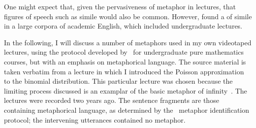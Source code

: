 One might expect that, given the pervasiveness of metaphor in
lectures, that figures of speech such as simile would also be common.
However,  found a 
of simile in a large corpora of academic English, which included
undergraduate lectures.

In the following, I will discuss a number of metaphors used in my own
videotaped lectures, using the protocol developed
by~ for undergraduate pure mathematics courses,
but with an emphasis on metaphorical language.  The source material is
taken verbatim from a lecture in which I introduced the Poisson
approximation to the binomial distribution.  This particular lecture
was chosen because the limiting process discussed is an examplar of
the basic metaphor of infinity~\parencite{lakoff2000}.  The lectures
were recorded two years ago.  The sentence fragments are those
containing metaphorical language, as determined by
the~\citeauthor{pragglejaz2077} metaphor identification protocol; the
intervening utterances contained no metaphor.

